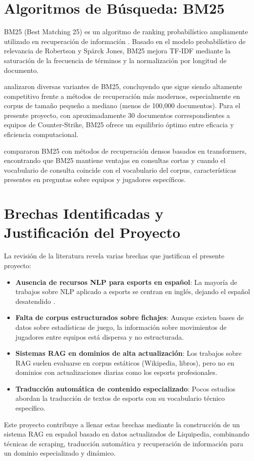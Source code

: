 \section{Algoritmos de Búsqueda: BM25}

BM25 (Best Matching 25) es un algoritmo de ranking probabilístico ampliamente utilizado en recuperación de información \cite{robertson2009probabilistic}. Basado en el modelo probabilístico de relevancia de Robertson y Spärck Jones, BM25 mejora TF-IDF mediante la saturación de la frecuencia de términos y la normalización por longitud de documento.

\cite{trotman2014improvements} analizaron diversas variantes de BM25, concluyendo que sigue siendo altamente competitivo frente a métodos de recuperación más modernos, especialmente en corpus de tamaño pequeño a mediano (menos de 100,000 documentos). Para el presente proyecto, con aproximadamente 30 documentos correspondientes a equipos de Counter-Strike, BM25 ofrece un equilibrio óptimo entre eficacia y eficiencia computacional.

\cite{lin2021pretrained} compararon BM25 con métodos de recuperación densos basados en transformers, encontrando que BM25 mantiene ventajas en consultas cortas y cuando el vocabulario de consulta coincide con el vocabulario del corpus, características presentes en preguntas sobre equipos y jugadores específicos.

\section{Brechas Identificadas y Justificación del Proyecto}

La revisión de la literatura revela varias brechas que justifican el presente proyecto:

\begin{itemize}
    \item \textbf{Ausencia de recursos NLP para esports en español}: La mayoría de trabajos sobre NLP aplicado a esports se centran en inglés, dejando el español desatendido \cite{esports2021nlp}.
    
    \item \textbf{Falta de corpus estructurados sobre fichajes}: Aunque existen bases de datos sobre estadísticas de juego, la información sobre movimientos de jugadores entre equipos está dispersa y no estructurada.
    
    \item \textbf{Sistemas RAG en dominios de alta actualización}: Los trabajos sobre RAG suelen evaluarse en corpus estáticos (Wikipedia, libros), pero no en dominios con actualizaciones diarias como los esports profesionales.
    
    \item \textbf{Traducción automática de contenido especializado}: Pocos estudios abordan la traducción de textos de esports con su vocabulario técnico específico.
\end{itemize}

Este proyecto contribuye a llenar estas brechas mediante la construcción de un sistema RAG en español basado en datos actualizados de Liquipedia, combinando técnicas de scraping, traducción automática y recuperación de información para un dominio especializado y dinámico.
